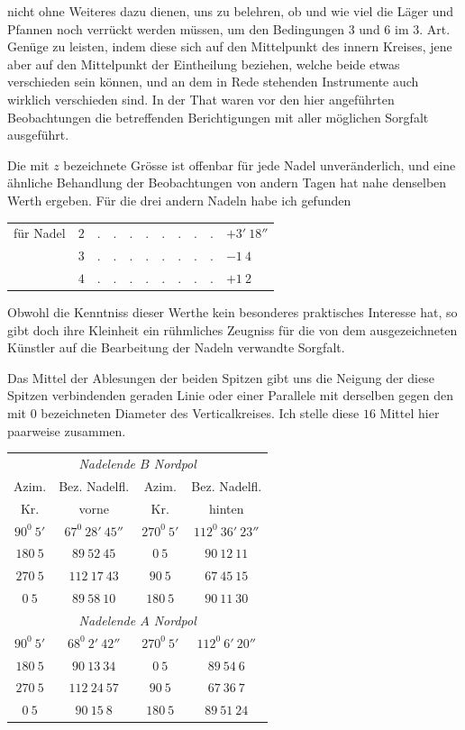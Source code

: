 \par\clearpage
{}
\noindent nicht ohne Weiteres dazu dienen, uns zu belehren, ob und wie viel die Läger und Pfannen noch verrückt werden müssen, um den Bedingungen 3 und 6 im 3. Art. Genüge zu leisten, indem diese sich auf den Mittelpunkt des innern Kreises, jene aber auf den Mittelpunkt der Eintheilung beziehen, welche beide etwas verschieden sein können, und an dem in Rede stehenden Instrumente auch wirklich verschieden sind. In der That waren vor den hier angeführten Beobachtungen die betreffenden Berichtigungen mit aller möglichen Sorgfalt ausgeführt.

Die mit $z$ bezeichnete Grösse ist offenbar für jede Nadel unveränderlich, und eine ähnliche Behandlung der Beobachtungen von andern Tagen hat nahe denselben Werth ergeben. Für die drei andern Nadeln habe ich gefunden
\begin{center}
\begin{tabular}{crll}
für Nadel&$2$&$.\quad.\quad.\quad.\quad.\quad.\quad.\quad.$&$+3'\ 18''$\\
&$3$&$.\quad.\quad.\quad.\quad.\quad.\quad.\quad.$&$-1\ 4$\\
&$4$&$.\quad.\quad.\quad.\quad.\quad.\quad.\quad.$&$+1\ 2$
\end{tabular}
\end{center}

Obwohl die Kenntniss dieser Werthe kein besonderes praktisches Interesse hat, so gibt doch ihre Kleinheit ein rühmliches Zeugniss für die von dem ausgezeichneten Künstler auf die Bearbeitung der Nadeln verwandte Sorgfalt.

Das Mittel der Ablesungen der beiden Spitzen gibt uns die Neigung der diese Spitzen verbindenden geraden Linie oder einer Parallele mit derselben gegen den mit $0$ bezeichneten Diameter des Verticalkreises. Ich stelle diese $16$ Mittel hier paarweise zusammen.
\begin{center}
{\fontsize{9}{11}\selectfont
\begin{tabular}{c|c||c|c}
\multicolumn{4}{c}{\normalsize\itshape Nadelende $B$ Nordpol}\\[2pt]
Azim.&Bez. Nadelfl.&Azim.&Bez. Nadelfl.\\
Kr.&vorne&Kr.&hinten\\\hline
\rule{0pt}{2.7ex}$90^0\ 5'$&$67^0\ 28'\ 45''$&$270^0\ 5'$&$112^0\ 36'\ 23''$\\
$180\ 5$&$89\ 52\ 45$&$0\ 5$&$90\ 12\ 11$\\
$270\ 5$&$112\ 17\ 43$&$90\ 5$&$67\ 45\ 15$\\
$0\ 5$&$89\ 58\ 10$&$180\ 5$&$90\ 11\ 30$\\[5pt]
\multicolumn{4}{c}{\normalsize\itshape Nadelende $A$ Nordpol}\\[2pt]
$90^0\ 5'$&$68^0\ 2'\ 42''$&$270^0\ 5'$&$112^0\ 6'\ 20''$\\
$180\ 5$&$90\ 13\ 34$&$0\ 5$&$89\ 54\ 6$\\
$270\ 5$&$112\ 24\ 57$&$90\ 5$&$67\ 36\ 7$\\
$0\ 5$&$90\ 15\ 8$&$180\ 5$&$89\ 51\ 24$
\end{tabular}}
\end{center}

